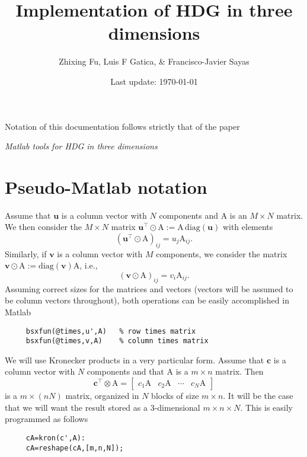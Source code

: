 \documentclass[10pt,english]{article}
\title{Implementation of HDG in three dimensions}
\author{Zhixing Fu, Luis F Gatica, \& Francisco-Javier Sayas}
\date{Last update: \today}
\begin{document}
\parindent=0pt


\maketitle
\tableofcontents

\newpage

\begin{framed}
Notation of this documentation follows strictly that of the paper
\begin{center}
\em Matlab tools for HDG in three dimensions
\end{center}
\end{framed}


\section{Pseudo-Matlab notation}

Assume that $\mathbf u$ is a column vector with $N$ components and $\mathrm A$ is an $M\times N$ matrix. We then consider the $M\times N$ matrix $\mathbf u^\top \odot \mathrm A:=\mathrm A\, \mathrm{diag}(\mathbf u)$ with elements
\[
(\mathbf u^\top \odot \mathrm A)_{ij}= u_j \mathrm A_{ij}.
\]
Similarly, if $\mathbf v$ is a column vector with $M$ components, we consider the matrix $\mathbf v\odot\mathrm A:=\mathrm{diag}(\mathbf v)\mathrm A $, i.e.,
\[
(\mathbf v \odot \mathrm A)_{ij}= v_i \mathrm A_{ij}.
\]
Assuming correct sizes for the matrices and vectors (vectors will be assumed to be column vectors throughout), both operations can be easily accomplished in Matlab
\begin{verbatim}
     bsxfun(@times,u',A)   % row times matrix
     bsxfun(@times,v,A)    % column times matrix
\end{verbatim}

We will use Kronecker products in a very particular form. Assume that $\mathbf c$ is a column vector with $N$ components and that $\mathrm A$ is a $m\times n$ matrix. Then
\[
\mathbf c^\top \otimes \mathrm A = \left[\begin{array}{c|c|c|c} c_1\mathrm A & c_2\mathrm A & \cdots & c_N \mathrm A\end{array}\right]
\]
is a $m\times (n N)$ matrix, organized in $N$ blocks of size $m\times n$. It will be the case that we will want the result stored as a $3$-dimensional $m\times n\times N$. This is easily programmed as follows

\begin{verbatim}
     cA=kron(c',A):  
     cA=reshape(cA,[m,n,N]); 
\end{verbatim}
\end{document}

